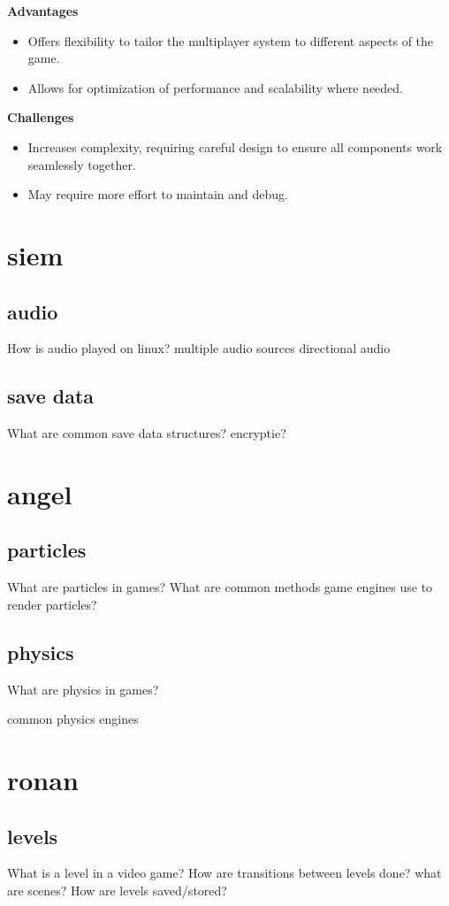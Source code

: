 \documentclass{article} %
\begin{document}
\textbf{Advantages}
\begin{itemize}
	\item Offers flexibility to tailor the multiplayer system to different aspects of the game.
	\item Allows for optimization of performance and scalability where needed.
\end{itemize}

\textbf{Challenges}
\begin{itemize}
	\item Increases complexity, requiring careful design to ensure all components work seamlessly together.
	\item May require more effort to maintain and debug.
\end{itemize}

\newpage

\section{siem}
\subsection{audio}
How is audio played on linux?
multiple audio sources
directional audio
\subsection{save data}
What are common save data structures?
encryptie?
\newpage

\section{angel}
\subsection{particles}
What are particles in games?
What are common methods game engines use to render particles?
\subsection{physics}
What are physics in games?

common physics engines

\newpage

\section{ronan}
\subsection{levels}
What is a level in a video game?
How are transitions between levels done?
what are scenes?
How are levels saved/stored?
\end{document}

